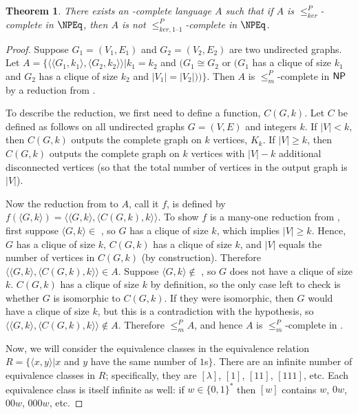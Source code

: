 \documentclass{article}
\newtheorem{theorem}{Theorem}[section]
\theoremstyle{definition} \newtheorem{definition}[definition]{Definition}
\newcommand{\sigmastar}{\{0, 1\}^{*}} %
\newcommand{\kr}{\leq^{P}_{ker}} %
\newcommand{\kri}{\leq^{P}_{ker,1\text{--}1}} %
\newcommand{\mor}{\leq^{P}_{m}} %
\newcommand{\pair}[2]{\langle#1,#2\rangle} %
\begin{document}
\begin{theorem}
  There exists an \NP-complete language $A$ such that if $A$ is $\kr$-complete
  in $\NPEq$, then $A$ is not $\kri$-complete in $\NPEq$.
\end{theorem}
\begin{proof}
  Suppose $G_1=(V_1, E_1)$ and $G_2=(V_2, E_2)$ are two undirected graphs.
  Let $A=\{\pair{\pair{G_1}{k_1}}{\pair{G_2}{k_2}}| k_1=k_2$ and $(G_1\cong G_2$ or $(G_1$ has a clique of size $k_1$ and $G_2$ has a clique of size $k_2$ and $|V_1|=|V_2|))\}$.
  Then $A$ is $\mor$-complete in ${\mathsf{NP}}$ by a reduction from .
  
  To describe the reduction, we first need to define a function, $C(G, k)$.
  Let $C$ be defined as follows on all undirected graphs $G=(V, E)$ and integers $k$.
  If $|V| < k$, then $C(G, k)$ outputs the complete graph on $k$ vertices, $K_k$.
  If $|V|\geq k$, then $C(G, k)$ outputs the complete graph on $k$ vertices with $|V|-k$ additional disconnected vertices (so that the total number of vertices in the output graph is $|V|$).

  Now the reduction from  to $A$, call it $f$, is defined by $f(\pair{G}{k})=\pair{\pair{G}{k}}{\pair{C(G, k)}{k}}$.
  To show $f$ is a many-one reduction from , first suppose $\pair{G}{k}\in$ , so $G$ has a clique of size $k$, which implies $|V|\geq k$.
  Hence, $G$ has a clique of size $k$, $C(G, k)$ has a clique of size $k$, and $|V|$ equals the number of vertices in $C(G, k)$ (by construction).
  Therefore $\pair{\pair{G}{k}}{\pair{C(G, k)}{k}}\in A$.
  Suppose $\pair{G}{k}\notin$ , so $G$ does not have a clique of size $k$.
  $C(G, k)$ has a clique of size $k$ by definition, so the only case left to check is whether $G$ is isomorphic to $C(G, k)$.
  If they were isomorphic, then $G$ would have a clique of size $k$, but this is a contradiction with the hypothesis, so $\pair{\pair{G}{k}}{\pair{C(G, k)}{k}}\notin A$.
  Therefore $\mor A$, and hence $A$ is $\mor$-complete in \NP.

  Now, we will consider the equivalence classes in the equivalence relation $R=\{\pair{x}{y}|x$ and $y$ have the same number of $1$s$\}$.
  There are an infinite number of equivalence classes in $R$; specifically, they are $[\lambda]$, $[1]$, $[11]$, $[111]$, etc.
  Each equivalence class is itself infinite as well: if $w\in\sigmastar$ then $[w]$ contains $w$, $0w$, $00w$, $000w$, etc.


\end{proof}
\end{document}
